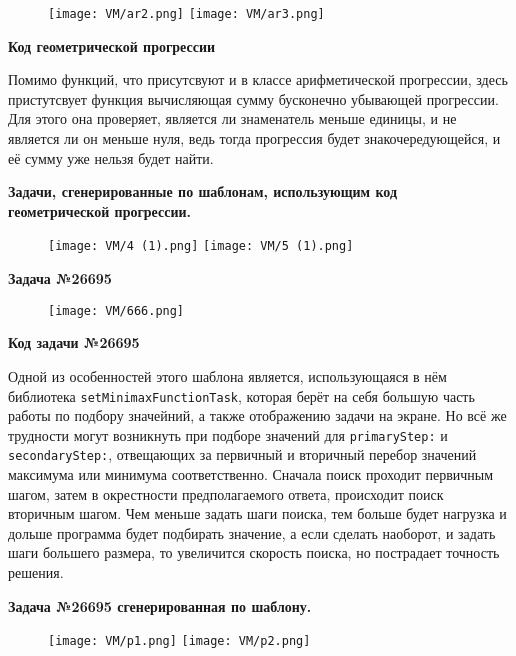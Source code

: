 \begin{figure}[h]
	\centering
	\texttt{[image: VM/ar2.png]}
	\texttt{[image: VM/ar3.png]}
	\end{figure}

\textbf{Код геометрической прогрессии}



Помимо функций, что присутсвуют и в классе арифметической прогрессии, здесь пристутсвует функция вычисляющая сумму бусконечно убывающей прогрессии. Для этого она проверяет, является ли знаменатель меньше единицы, и не является ли он меньше нуля, ведь тогда прогрессия будет знакочередующейся, и её сумму уже нельзя будет найти.

\textbf{Задачи, сгенерированные по шаблонам, использующим код 
\\геометрической прогрессии.}

	\begin{figure}[h]
		\centering
		\texttt{[image: VM/4 (1).png]}
		\texttt{[image: VM/5 (1).png]}
	\end{figure}
	
\textbf{Задача №26695}

	\begin{figure}[h]
		\centering
		\texttt{[image: VM/666.png]}
	\end{figure}

\textbf{Код задачи №26695}



Одной из особенностей этого шаблона является, использующаяся в нём библиотека \texttt{setMinimaxFunctionTask}, которая берёт на себя большую часть работы по подбору значейний, а также отображению задачи на экране. Но всё же трудности могут возникнуть при подборе значений для  \texttt{primaryStep:} и \texttt{secondaryStep:}, отвещающих за первичный и вторичный перебор значений максимума или минимума соответственно. Сначала поиск проходит первичным шагом, затем в окрестности предполагаемого ответа, происходит поиск вторичным шагом. Чем меньше задать шаги поиска, тем больше будет нагрузка и дольше программа будет подбирать значение, а если сделать наоборот, и задать шаги большего размера, то увеличится скорость поиска, но пострадает точность решения.


\textbf{Задача №26695 сгенерированная по шаблону.}
	\begin{figure}[h]
		\centering
		\texttt{[image: VM/p1.png]}
		\texttt{[image: VM/p2.png]}
	\end{figure}

